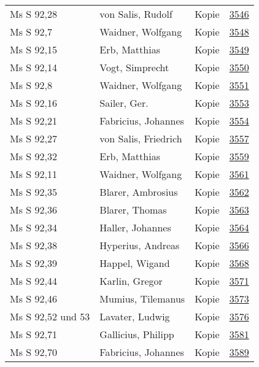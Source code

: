 \documentclass[10pt,a4paper,landscape]{report}
\begin{document}
\begin{longtable}{p{16cm}p{4cm}lr}
Ms S 92,28	&	von Salis, Rudolf	&	Kopie	&	\href{http://130.60.24.72/assignment/3546}{3546}\\
Ms S 92,7	&	Waidner, Wolfgang	&	Kopie	&	\href{http://130.60.24.72/assignment/3548}{3548}\\
Ms S 92,15	&	Erb, Matthias	&	Kopie	&	\href{http://130.60.24.72/assignment/3549}{3549}\\
Ms S 92,14	&	Vogt, Simprecht	&	Kopie	&	\href{http://130.60.24.72/assignment/3550}{3550}\\
Ms S 92,8	&	Waidner, Wolfgang	&	Kopie	&	\href{http://130.60.24.72/assignment/3551}{3551}\\
Ms S 92,16	&	Sailer, Ger.	&	Kopie	&	\href{http://130.60.24.72/assignment/3553}{3553}\\
Ms S 92,21	&	Fabricius, Johannes	&	Kopie	&	\href{http://130.60.24.72/assignment/3554}{3554}\\
Ms S 92,27	&	von Salis, Friedrich	&	Kopie	&	\href{http://130.60.24.72/assignment/3557}{3557}\\
Ms S 92,32	&	Erb, Matthias	&	Kopie	&	\href{http://130.60.24.72/assignment/3559}{3559}\\
Ms S 92,11	&	Waidner, Wolfgang	&	Kopie	&	\href{http://130.60.24.72/assignment/3561}{3561}\\
Ms S 92,35	&	Blarer, Ambrosius	&	Kopie	&	\href{http://130.60.24.72/assignment/3562}{3562}\\
Ms S 92,36	&	Blarer, Thomas	&	Kopie	&	\href{http://130.60.24.72/assignment/3563}{3563}\\
Ms S 92,34	&	Haller, Johannes	&	Kopie	&	\href{http://130.60.24.72/assignment/3564}{3564}\\
Ms S 92,38	&	Hyperius, Andreas	&	Kopie	&	\href{http://130.60.24.72/assignment/3566}{3566}\\
Ms S 92,39	&	Happel, Wigand	&	Kopie	&	\href{http://130.60.24.72/assignment/3568}{3568}\\
Ms S 92,44	&	Karlin, Gregor	&	Kopie	&	\href{http://130.60.24.72/assignment/3571}{3571}\\
Ms S 92,46	&	Mumius, Tilemanus	&	Kopie	&	\href{http://130.60.24.72/assignment/3573}{3573}\\
Ms S 92,52 und 53	&	Lavater, Ludwig	&	Kopie	&	\href{http://130.60.24.72/assignment/3576}{3576}\\
Ms S 92,71	&	Gallicius, Philipp	&	Kopie	&	\href{http://130.60.24.72/assignment/3581}{3581}\\
Ms S 92,70	&	Fabricius, Johannes	&	Kopie	&	\href{http://130.60.24.72/assignment/3589}{3589}\\

\end{longtable}
\end{document}
